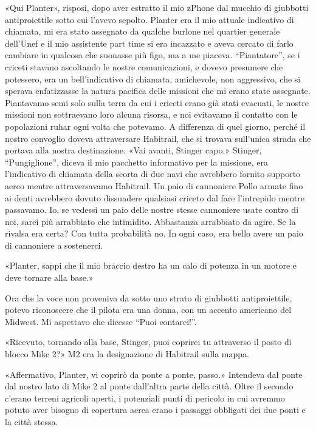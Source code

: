 «Qui Planter», risposi, dopo aver estratto il mio zPhone dal mucchio di
giubbotti antiproiettile sotto cui l'avevo sepolto. Planter era il mio
attuale indicativo di chiamata, mi era stato assegnato da qualche
burlone nel quartier generale dell'Unef e il mio assistente part time si
era incazzato e aveva cercato di farlo cambiare in qualcosa che suonasse
più figo, ma a me piaceva. ``Piantatore'', se i criceti stavano
ascoltando le nostre comunicazioni, e dovevo presumere che potessero,
era un bell'indicativo di chiamata, amichevole, non aggressivo, che si
sperava enfatizzasse la natura pacifica delle missioni che mi erano
state assegnate. Piantavamo semi solo sulla terra da cui i criceti erano
già stati evacuati, le nostre missioni non sottraevano loro alcuna
risorsa, e noi evitavamo il contatto con le popolazioni ruhar ogni volta
che potevamo. A differenza di quel giorno, perché il nostro convoglio
doveva attraversare Habitrail, che si trovava sull'unica strada che
portava alla nostra destinazione. «Vai avanti, Stinger capo.» Stinger,
``Pungiglione'', diceva il mio pacchetto informativo per la missione,
era l'indicativo di chiamata della scorta di due navi che avrebbero
fornito supporto aereo mentre attraversavamo Habitrail. Un paio di
cannoniere Pollo armate fino ai denti avrebbero dovuto dissuadere
qualsiasi criceto dal fare l'intrepido mentre passavamo. Io, se vedessi
un paio delle nostre stesse cannoniere usate contro di noi, sarei più
arrabbiato che intimidito. Abbastanza arrabbiato da agire. Se la rivalsa
era certa? Con tutta probabilità no. In ogni caso, era bello avere un
paio di cannoniere a sostenerci.

«Planter, sappi che il mio braccio destro ha un calo di potenza in un
motore e deve tornare alla base.»

Ora che la voce non proveniva da sotto uno strato di giubbotti
antiproiettile, potevo riconoscere che il pilota era una donna, con un
accento americano del Midwest. Mi aspettavo che dicesse ``Puoi
contarci!''.

«Ricevuto, tornando alla base, Stinger, puoi coprirci tu attraverso il
posto di blocco Mike 2?» M2 era la designazione di Habitrail sulla
mappa.

«Affermativo, Planter, vi coprirò da ponte a ponte, passo.» Intendeva
dal ponte dal nostro lato di Mike 2 al ponte dall'altra parte della
città. Oltre il secondo c'erano terreni agricoli aperti, i potenziali
punti di pericolo in cui avremmo potuto aver bisogno di copertura aerea
erano i passaggi obbligati dei due ponti e la città stessa.

